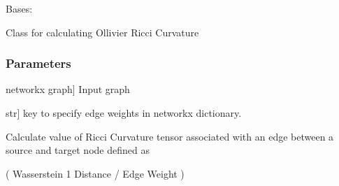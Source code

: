 \documentclass[letterpaper,10pt,english]{sphinxmanual}
\begin{document}
\begin{fulllineitems}
\label{\detokenize{graph_ricci_curvature:graph_ricci_curvature.ollivier_ricci_curvature.OllivierRicciCurvature}}
\pysigstartsignatures
{}
\pysigstopsignatures
\sphinxAtStartPar
Bases: {\hyperref[\detokenize{graph_ricci_curvature:graph_ricci_curvature.ricci_curvature.RicciCurvature}]{}}

\sphinxAtStartPar
Class for calculating Ollivier Ricci Curvature


\subsubsection{Parameters}
\label{\detokenize{graph_ricci_curvature:id1}}\begin{description}
\sphinxlineitem{G}{[}networkx graph{]}
\sphinxAtStartPar
Input graph

\sphinxlineitem{weight\_key}{[}str{]}
\sphinxAtStartPar
key to specify edge weights in networkx dictionary.

\end{description}

\begin{fulllineitems}
\label{\detokenize{graph_ricci_curvature:graph_ricci_curvature.ollivier_ricci_curvature.OllivierRicciCurvature.calculate_edge_curvature}}
\pysigstartsignatures
{}
\pysigstopsignatures
\sphinxAtStartPar
Calculate value of Ricci Curvature tensor associated with an edge
between a source and target node defined as

 \sphinxhyphen{} ( Wasserstein 1 Distance / Edge Weight )



\end{fulllineitems}
\end{fulllineitems}
\end{document}
